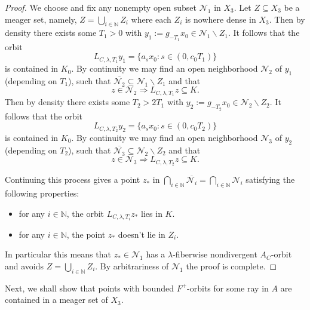 \documentclass[reqno,12pt]{amsart}
\theoremstyle{definition}
\numberwithin{equation}{section}
\newcommand{\NN}{\mathbb{N}}
\newcommand{\cN}{\mathcal{N}}
\renewcommand{\setminus}{\smallsetminus}
\begin{document}
{\begin{proof}
    We choose and fix any nonempty open subset $\cN_1$ in $X_3$. Let $Z\subseteq X_3$ be a meager set, namely, $Z=\bigcup_{i\in\NN}Z_i$ where each $Z_i$ is nowhere dense in $X_3$. Then by density there exists some $T_1>0$ with $y_1:=g_{-T_1}x_0\in \cN_1\setminus Z_1$. It follows that the orbit \begin{equation*}
		L_{C,\lambda,T_1}y_1=\{a_sx_0:s\in (0,c_0T_1)\}
	\end{equation*}
	is contained in $K_0$. By continuity we may find an open neighborhood $\cN_2$ of $y_1$ (depending on $T_1$), such that $\overline{\cN_2}\subseteq \cN_1\setminus Z_1$ and that \begin{equation*}
		z\in \cN_2\Longrightarrow L_{C,\lambda,T_1}z\subseteq K.
	\end{equation*}
	Then by density there exists some $T_2>2T_1$ with $y_2:=g_{-T_2}x_0\in \cN_2\setminus Z_2$.
	It follows that the orbit \begin{equation*}
		L_{C,\lambda,T_2}y_2=\{a_sx_0:s\in (0,c_0T_2)\}
	\end{equation*}
	is contained in $K_0$. By continuity we may find an open neighborhood $\cN_3$ of $y_2$ (depending on $T_2$), such that $\overline{\cN_3}\subseteq \cN_2\setminus Z_2$ and that \begin{equation*}
		z\in \cN_3\Longrightarrow L_{C,\lambda,T_2}z\subseteq K.
	\end{equation*}
	
	Continuing this process gives a point $z_*$ in $\bigcap_{i\in \NN}\overline{\cN_i}=\bigcap_{i\in \NN}\cN_i$ satisfying the following properties:
	\begin{itemize}
		\item for any $i\in\NN$, the orbit $L_{C,\lambda,T_i}z_*$ lies in $K$.
		\item for any $i\in\NN$, the point $z_*$ doesn't lie in $Z_i$.
	\end{itemize}
	In particular this means that $z_*\in \cN_1$ has a $\lambda$-fiberwise nondivergent $A_C$-orbit and avoids $Z=\bigcup_{i\in\NN}Z_i$. By arbitrariness of $\cN_1$ the proof is complete.
\end{proof}

Next, we shall show that points with bounded $F^+$-orbits for some ray in $A$ are contained in a meager set of $X_3$.

}
\end{document}
